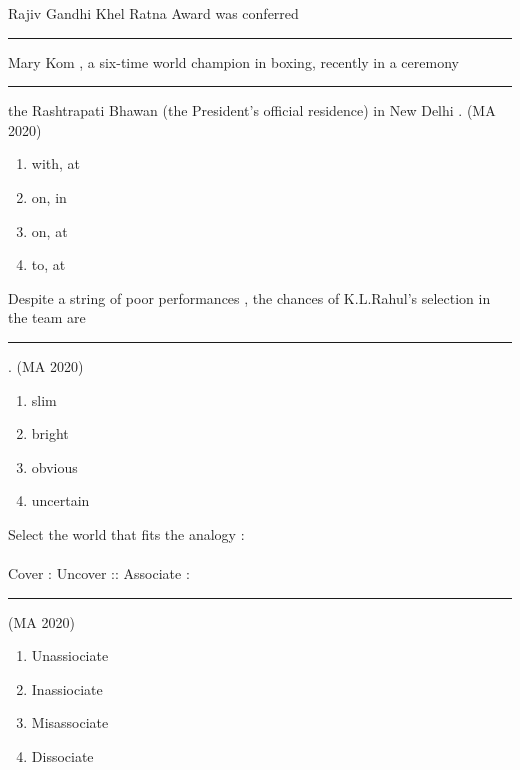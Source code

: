 \iffalse
\title{MA-2020-1-13}
\author{EE24BTECH11041-Mohit}
\section{MA}
\chapter{2020}
\fi
\item Rajiv Gandhi Khel Ratna Award was conferred \rule{2cm}{0.4pt} Mary Kom , a six-time world champion in boxing, recently in a ceremony \rule{2cm}{0.4pt} the Rashtrapati Bhawan (the President's official residence) in New Delhi .
\hfill{(MA 2020)}

\begin{enumerate}
\item with, at
\item on, in
\item on, at
\item to, at
\end{enumerate}

\item Despite a string of poor performances , the chances of K.L.Rahul's selection in the team are \rule{2cm}{0.4pt} .
\hfill{(MA 2020)}
\begin{enumerate}
\item slim
\item bright
\item obvious
\item uncertain
\end{enumerate}

\item Select the world that fits the analogy :\\
\\
Cover : Uncover :: Associate :  \rule{2cm}{0.4pt}
\hfill{(MA 2020)}
\begin{enumerate}
\item Unassiociate
\item Inassiociate
\item Misassociate
\item Dissociate
\end{enumerate}

